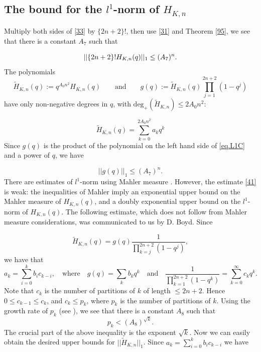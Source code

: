 \documentclass{amsart}
\theoremstyle{definition}
\def\printname#1{
    \if\draft y
        \smash{\makebox[0pt]{\hspace{-0.5in}
            \raisebox{8pt}{\tt\tiny #1}}}
    \fi
}
\def\lbl#1{\label{#1}\printname{#1}}
\def\maxdeg{\mathrm{deg}_+}
\newcommand{\tH}{\tilde H}
\begin{document}
\subsection{The bound for the $l^1$-norm of $H_{K,n}$}

 Multiply both sides of \eqref{33}  by $\{2n+2\}!$,
then use  \eqref{31} and Theorem \ref{95}, we see that there is a constant
$A_7$ such that

\begin{equation}
\lbl{eq.L1C} ||\{2n+2\}!H_{K,n}(q)||_1 \leq  (A_7)^n.
\end{equation}
The polynomials
$$
\tH_{K,n}(q) := q^{A_0n^2} H_{K,n}(q) \qquad
\text{and} \qquad  g(q):=\tH_{K,n}(q) \prod_{j=1}^{2n+2}(1-q^j)
$$
have only non-negative degrees in $q$, with $\maxdeg(\tH_{K,n}) \le
2A_0n^2$:

\begin{equation}
\tH_{K,n}(q) = \sum_{k=0}^{2A_0n^2} a_k q^k
\end{equation}
 Since $g(q)$ is the product of the polynomial on the left hand
side of \eqref{eq.L1C} and a power of $q$, we have

\begin{equation}
 ||g(q)||_1 \leq (A_7)^n.
\label{41}
\end{equation}
There are estimates of $l^1$-norm using Mahler measure \cite{Mahler}.
However, the estimate \eqref{41} is weak: the  inequalities of Mahler
imply an exponential upper bound on the Mahler measure of $H_{K,n}(q)$,
and a doubly exponential upper bound on the $l^1$-norm of $H_{K,n}(q)$. The
following estimate, which does not follow from Mahler
measure considerations, was communicated to us by D. Boyd. Since


$$
\tH_{K,n}(q) = g(q) \frac{1}{\prod_{k=j}^{2n+2} (1-q^j)},
$$
we have that
$$
a_k=\sum_{i=0}^k b_i c_{k-i}, \quad \text{where} \quad g(q) =
\sum_{k} b_k q^k \quad \text{and} \quad \frac{1}{\prod_{k=1}^{2n+2}
(1-q^k)}=\sum_{k=0}^\infty c_k q^k.
$$
Note that $c_k$ is the number of partitions of $k$ of length $\le
2n+2$. Hence $0\le c_{k-1} \le c_k$, and $c_k\le p_k$, where $p_k$
is the number of partitions of $k$. Using the growth rate of $p_k$
(see \cite{An}), we see that there is a constant $A_8$ such that
\begin{equation}
p_k < (A_8)^{\sqrt k}.\label{42}
\end{equation}
The crucial part of the above inequality is the exponent
$\sqrt{k}$. Now we can easily
obtain the desired upper bounds for $||\tH_{K,n}||_1$.
Since $ a_k=\sum_{i=0}^k b_i c_{k-i}$  we have
\end{document}
